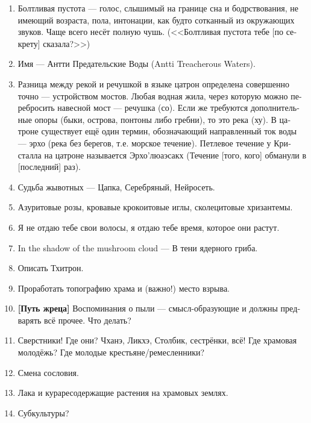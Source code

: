 \documentclass[a4paper,12pt,fleqn]{book}\usepackage{polyglossia}\setdefaultlanguage[babelshorthands=true]{russian}\setotherlanguage{english}\defaultfontfeatures{Ligatures=TeX,Mapping=tex-text}\usepackage{xcolor}\newcommand{\ml}[3]{#2}
\begin{document}
{\begin{enumerate}
\item Болтливая пустота --- голос, слышимый на границе сна и бодрствования, не имеющий возраста, пола, интонации, как будто сотканный из окружающих звуков.
Чаще всего несёт полную чушь.
(<<Болтливая пустота тебе [по секрету] сказала?>>)

\item Имя --- Антти Предательские Воды (Antti Treacherous Waters).

\item Разница между рекой и речушкой в языке цатрон определена совершенно точно --- устройством мостов.
Любая водная жила, через которую можно перебросить навесной мост --- речушка (со).
Если же требуются дополнительные опоры (быки, острова, понтоны либо гребни), то это река (ху).
В цатроне существует ещё один термин, обозначающий направленный ток воды --- эрхо (река без берегов, т.е. морское течение).
Петлевое течение у Кристалла на цатроне называется Эрхо'люаэсакх (Течение [того, кого] обманули в [последний] раз).

\item Судьба жывотных --- Цапка, Серебряный, Нейросеть.

\item Азуритовые розы, кровавые крокоитовые иглы, сколецитовые хризантемы.

\item Я не отдаю тебе свои волосы, я отдаю тебе время, которое они растут.

\item In the shadow of the mushroom cloud --- В тени ядерного гриба.

\item Описать Тхитрон.

\item Проработать топографию храма и (важно!) место взрыва.

\item \textbf{[Путь жреца]} Воспоминания о пыли --- смысл-образующие и должны предварять всё прочее.
Что делать?

\item Сверстники!
Где они?
Чханэ, Ликхэ, Столбик, сестрёнки, всё!
Где храмовая молодёжь?
Где молодые крестьяне/ремесленники?

\item Смена сословия.

\item Лака и кураресодержащие растения на храмовых землях.

\item Субкультуры?


\end{enumerate}}
\end{document}
